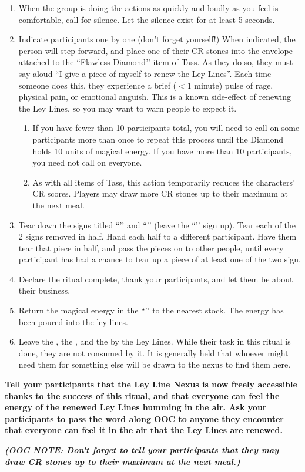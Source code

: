 \documentclass[green]{GL2020}
\begin{document}
\begin{enumerate}
  \item When the group is doing the actions as quickly and loudly as you feel is comfortable, call for silence. Let the silence exist for at least 5 seconds.
  \item Indicate participants one by one (don’t forget yourself!) When indicated, the person will step forward, and place one of their CR stones into the envelope attached to the ``Flawless Diamond’’ item of Tass. As they do so, they must say aloud “I give a piece of myself to renew the Ley Lines”. Each time someone does this, they experience a brief ($<$1 minute) pulse of rage, physical pain, or emotional anguish. This is a known side-effect of renewing the Ley Lines, so you may want to warn people to expect it.
    \begin{enumerate}
    \item If you have fewer than 10 participants total, you will need to call on some participants more than once to repeat this process until the Diamond holds 10 units of magical energy. If you have more than 10 participants, you need not call on everyone.
    \item As with all items of Tass, this action temporarily reduces the characters’ CR scores. Players may draw more CR stones up to their maximum at the next meal.
  \end{enumerate}  
  \item Tear down the signs titled ``\sLeyLinesNexus{}’’ and ``\sLeyLinesSad{}’’ (leave the ``\sLeyLinesHappy{}’’ sign up). Tear each of the 2 signs removed in half. Hand each half to a different participant. Have them tear that piece in half, and pass the pieces on to other people, until every participant has had a chance to tear up a piece of at least one of the two sign.
  \item Declare the ritual complete, thank your participants, and let them be about their business.
  \item Return the magical energy in the ``\iDiamond{}’’ to the nearest stock. The energy has been poured into the ley lines. 
  \item Leave the \iClay{}, the \iObsidian{}, and the \iLimestone{} by the Ley Lines. While their task in this ritual is done, they are not consumed by it. It is generally held that whoever might need them for something else will be drawn to the nexus to find them here.
\end{enumerate}

\textbf{Tell your participants that the Ley Line Nexus is now freely accessible thanks to the success of this ritual, and that everyone can feel the energy of the renewed Ley Lines humming in the air. Ask your participants to pass the word along OOC to anyone they encounter that everyone can feel it in the air that the Ley Lines are renewed.}

\emph{\textbf{(OOC NOTE: Don’t forget to tell your participants that they may draw CR stones up to their maximum at the next meal.)}}
\end{document}

